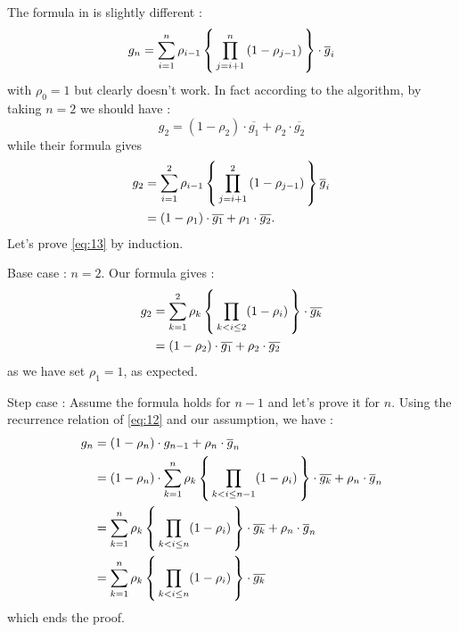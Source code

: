 The formula in \cite{FWBQ} is slightly different :
\begin{equation*}
  g _ { n } = \sum _ { i = 1 } ^ { n } \rho _ { i - 1 }\left \{ \,  \prod _ { j = i + 1 } ^ { n } \left( 1 - \rho _ { j - 1 } \right)  \, \right \} \cdot \overline { g } _ { i }
\end{equation*}
with $\rho_0=1$ but clearly doesn't work. In fact according to the algorithm, by taking $n=2$ we should have :
\begin{equation*}
  g_2 = (1-\rho_2) \cdot \overline{g_1} + \rho_2 \cdot \overline{g_2}
\end{equation*}
while their formula gives
\begin{align*}
  g _ { 2 } &= \sum _ { i = 1 } ^ { 2 } \rho _ { i - 1 }\left \{ \,  \prod _ { j = i + 1 } ^ { 2 } \left( 1 - \rho _ { j - 1 } \right)  \, \right \} \overline { g } _ { i }\\
  &= (1-\rho_1) \cdot  \overline{g_1}+\rho_1 \cdot \overline{g_2}.
\end{align*}
Let's prove \eqref{eq:13} by induction.

\begin{boxcomputation}
\begin{mydescription}
  \item [Base case]: $n=2$. Our formula gives :
  \begin{align*}
    g_2 &= \sum_{k=1}^2  \rho_k \left \{ \, \prod_{k<i\leq 2} (1-\rho_i) \, \right \} \cdot \overline{g_k}\\
    &= (1-\rho_2) \cdot \overline{g_1}+ \rho_2 \cdot \overline{g_2}
  \end{align*}
  as we have set $\rho_1 = 1$, as expected.
  \item [Step case]: Assume the formula holds for $n-1$ and let's prove it for $n$.
  Using the recurrence relation of \eqref{eq:12} and our assumption, we have :
  \begin{align*}
    g _ {n} &= \left( 1 - \rho _ {n} \right) \cdot g _ {n- 1 } + \rho _ {n} \cdot \overline { g } _ {n}\\
    &= \left( 1 - \rho _ { n } \right) \cdot \sum_{k=1}^n \rho_k \left \{ \, \prod_{k<i\leq n-1} (1-\rho_i) \, \right \} \cdot \overline{g_k} + \rho_n \cdot \overline { g } _ {n}\\
    &= \sum_{k=1}^n \rho_k \left \{ \, \prod_{k<i\leq n} (1-\rho_i) \, \right \} \cdot \overline{g_k} + \rho_n\cdot \overline { g } _ {n}\\
    &= \sum_{k=1}^n \rho_k \left \{ \, \prod_{k<i\leq n} (1-\rho_i) \, \right \}  \cdot \overline{g_k}
  \end{align*}
  which ends the proof.
\end{mydescription}
\end{boxcomputation}

